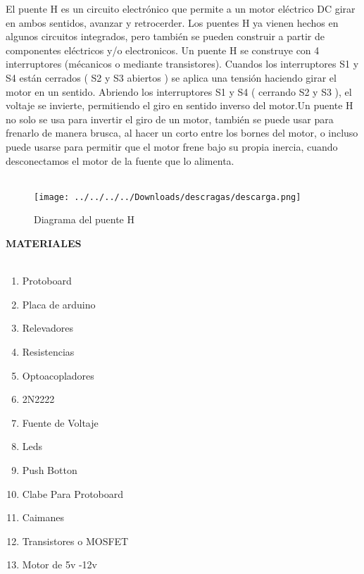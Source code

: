 \documentclass[12pt]{report}
\begin{document}
{\large El puente H  es un circuito electrónico que permite a un motor eléctrico DC girar en ambos sentidos, avanzar y retrocerder.
Los puentes H ya vienen hechos en algunos circuitos integrados, pero también se pueden construir a partir de componentes eléctricos y/o electronicos.
Un puente H se construye con 4 interruptores (mécanicos o mediante transistores). Cuandos los interruptores S1 y S4 están cerrados ( S2 y S3 abiertos ) se aplica una tensión haciendo girar el motor en un sentido. Abriendo los interruptores S1 y S4 ( cerrando S2 y S3 ), el voltaje se invierte, permitiendo el giro en sentido inverso del motor.Un puente H no solo se usa para invertir el giro de un motor, también se puede usar para frenarlo de manera brusca, al hacer un corto entre los bornes del motor, o incluso puede usarse para permitir que el motor frene bajo su propia inercia, cuando desconectamos el motor de la fuente que lo alimenta.\\}\\
\begin{center}
\begin{figure}[hbtp]
\caption{Diagrama del puente H}
\centering
\texttt{[image: ../../../../Downloads/descragas/descarga.png]}
\end{figure}

\end{center}


{\huge \textbf{MATERIALES}\\}\\


\begin{enumerate}
\item Protoboard
\item Placa de arduino
\item Relevadores
\item Resistencias
\item Optoacopladores
\item 2N2222
\item Fuente de Voltaje
\item Leds
\item Push Botton
\item Clabe Para Protoboard
\item Caimanes
\item Transistores o MOSFET
\item Motor de 5v -12v
\end{enumerate}
\end{document}
